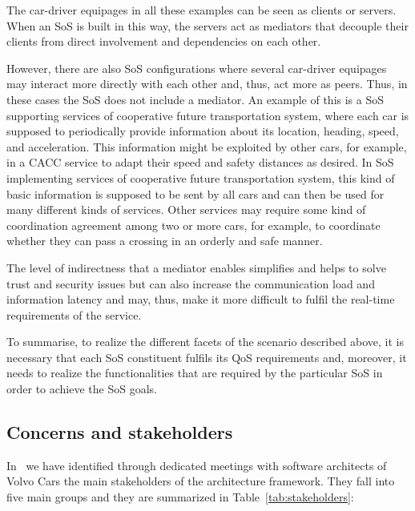 The car-driver equipages in all these examples can be seen as clients or servers. When an SoS is built in this way, the servers act as mediators that decouple their clients from direct involvement and dependencies on each other.

However, there are also SoS configurations where several car-driver equipages may interact more directly with each other and, thus, act more as peers. Thus, in these cases the SoS does not include a mediator. An example of this is a SoS supporting services of cooperative future transportation system, where each car is supposed to periodically provide information about its location, heading, speed, and acceleration. This information might be exploited by other cars, for example, in a CACC service to adapt their speed and safety distances as desired. In SoS implementing services of cooperative future transportation system, this kind of basic information is supposed to be sent by all cars and can then be used for many different kinds of services. Other services may require some kind of coordination agreement among two or more cars, for example, to coordinate whether they can pass a crossing in an orderly and safe manner.

The level of indirectness that a mediator enables simplifies and helps to solve trust and security issues but can also increase the communication load and information latency and may, thus, make it more difficult to fulfil the real-time requirements of the service.

To summarise, to realize the different facets of the scenario described above, it is necessary that each SoS constituent fulfils its QoS requirements and, moreover, it needs to realize the functionalities that are required by the particular SoS in order to achieve the SoS goals.

\subsection{Concerns and stakeholders}

In~\cite{JSA2017} we have identified through dedicated meetings with software architects of Volvo Cars the main stakeholders of the architecture framework. They fall into five main groups and they are summarized in Table~\ref{tab:stakeholders}: 

